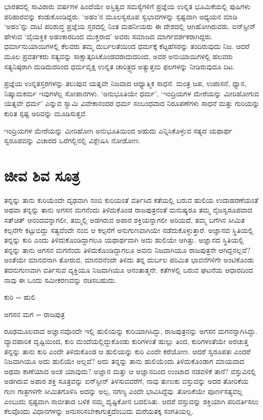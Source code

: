 ಭಾರತದಲ್ಲಿ ಸಾವಿರಾರು ವರ್ಷಗಳ ಹಿಂದೆಯೇ ಅಸ್ತಿತ್ವದ ಸಮಸ್ಯೆಗಳಿಗೆ ಪ್ರಜ್ಞೆಯ ಉನ್ನತ ಭೂಮಿಕೆಯಲ್ಲಿ ಪುಷಿಗಳು ಪರಿಹಾರವನ್ನು ಕಂಡುಕೊಂಡಿದ್ದರು. ‘ಅಹಂ’ನ ಮೂಲಸ್ವರೂಪ ಸ್ವಭಾವಗಳನ್ನು ಸ್ಪಷ್ಟವಾಗಿ ಅಧ್ಯಯನ ಮಾಡಿ ‘ಅಹಂ’ನ್ನು ದಾಟಿ ಪರಿಶುದ್ಧ ಪ್ರಜ್ಞೆಯ ಸ್ತರದಲ್ಲಿ ನಿಂತ ಮಹನೀಯರು ಈ ದೇಶದಲ್ಲಿ ಆಗಿಹೋಗಿರುವರು. ಐನ್​ಸ್ಟೀನ್ ಹೇಳುವ ‘ವೈಯಕ್ತಿಕ ಅಹಂಕಾರದಿಂದ ಮುಕ್ತರಾದ’ ಅವರು ಸಮಾಜದ ಮಾರ್ಗದರ್ಶಕರಾಗಿದ್ದರು. ಧರ್ಮಾನು\-ಯಾಯಿಗಳಲ್ಲಿ ಕೆಲವರು ತಮ್ಮ ದುರ್ಬಲತೆಯಿಂದ ಧರ್ಮಕ್ಕೆ ಕೆಟ್ಟಹೆಸರನ್ನು ತಂದಿರುವುದು ನಿಜ. ಆದರೆ ಮೂಲ ಪ್ರವರ್ತಕರು ಸತ್ಯವನ್ನು ಸಾಕ್ಷಾತ್ಕರಿಸಿಕೊಂಡವರಾದುದರಿಂದ, ಅವರ ಅನುಯಾಯಿಗಳಲ್ಲಿ ಹಲವರು ಸತ್ಯನಿಷ್ಠರಾಗಿ ದುಡಿದುದರಿಂದ ಧರ್ಮವೃಕ್ಷ ಉನ್ನತ ಚಾರಿತ್ರ್ಯದ ಅತ್ಯುತ್ತಮ ಫಲಗಳನ್ನು ನೀಡಿರುವುದೂ ದಿಟ.

ಪ್ರಜ್ಞೆಯ ಉನ್ನತಸ್ತರಗಳನ್ನು ತಲುಪುವ ಯತ್ನವೇ ನಿಜವಾದ ಆಧ್ಯಾತ್ಮಿಕ ಸಾಧನೆ. ಮಂತ್ರ ಜಪ, ಉಪಾಸನೆ, ಧ್ಯಾನ, ನಿಷ್ಕಾಮಕರ್ಮ ಇವುಗಳೆಲ್ಲ ಸೋಪಾನಗಳು. ‘ಅನುಭೂತಿಯೇ ಧರ್ಮ’, ‘ಇಂದ್ರಿಯಗಳ ಮೇರೆಯನ್ನು ಮೀರಿಹೋಗುವ ಯತ್ನವೇ ಧರ್ಮ’ ಎನ್ನುವ ಸ್ವಾಮಿ ವಿವೇಕಾನಂದರ ಧರ್ಮ ಸಂಬಂಧವಾದ ನಿರೂಪಣೆಗಳು ಸಾಧನೆ ಮತ್ತು ಗುರಿಯನ್ನು ಕುರಿತ ಸ್ಪಷ್ಟ ಅರಿವನ್ನು ಮೂಡಿಸುತ್ತವೆ.

ಇಂದ್ರಿಯಗಳ ಮೇರೆಯನ್ನು ಮೀರಿಹೋಗಿ ಅನುಭೂತಿಯಿಂದ ಅಹುದು ಎನ್ನಿಸಿಕೊಳ್ಳುವ ಸತ್ಯದ ಯಥಾರ್ಥ ಸ್ವರೂಪವನ್ನು ವಿಚಾರದ ಒರೆಗಲ್ಲಿನಲ್ಲಿ ವಿಶ್ಲೇಷಿಸಿ ನೋಡೋಣ.


\section*{ಜೀವ ಶಿವ ಸೂತ್ರ}


ತನ್ನನ್ನು ತಾನು ಕುರಿಯೆಂದೇ ದೃಢವಾಗಿ ನಂಬಿ ಕುರಿಯಂತೆ ವರ್ತಿಸಿದ ಕತೆಯಲ್ಲಿ ಬರುವ ಹುಲಿಯ ಉದಾಹರಣೆಯಂತೆ ಅಥವಾ ತನ್ನನ್ನು ತಾನು ಅಗಸನ ಮಗನೆಂದು ತಿಳಿದುಕೊಂಡ ರಾಜಪುತ್ರನಂತೆ ಮನುಷ್ಯರೂ ತಮ್ಮ ನೈಜಸ್ವರೂಪವಾದ ಸತ್​ಚಿತ್ ಆನಂದವನ್ನಾಗಲೀ, ತಮ್ಮಲ್ಲಿ ಅಡಗಿರುವ ಅಪಾರ ಶಕ್ತಿಯನ್ನಾಗಲೀ ಅರಿಯದೆ, ತಮ್ಮ ಬಗೆಗಿನ ಸೀಮಿತ ಕಲ್ಪನೆಗೇ ಕಟ್ಟುಬಿದ್ದು ಸತ್ಯವೆಂದೇ ನಂಬಿ ಆ ಕಲ್ಪನೆಗೆ ಅನುಗುಣವಾಗಿಯೇ ನಡೆದುಕೊಳ್ಳುತ್ತಾರೆ. ಅಜ್ಞಾನದ ಸ್ಥಿತಿಯಲ್ಲಿ ತನ್ನನ್ನು ಕುರಿ ಎಂದು ತಿಳಿದುಕೊಂಡಿದ್ದಾಗಲೂ ಯಥಾರ್ಥವಾಗಿ ಅದು ಹುಲಿಯೇ ಆಗಿತ್ತು. ಅಜ್ಞಾನದ ಸ್ಥಿತಿಯಲ್ಲಿ ತನ್ನನ್ನು ತಾನು ಅಗಸನ ಮಗನೆಂದು ತಿಳಿದುಕೊಂಡಿದ್ದಾಗಲೂ ಅವನು ನಿಜವಾಗಿಯೂ ರಾಜಪುತ್ರನೇ ಆಗಿದ್ದನಲ್ಲವೆ? ಅಂತೆಯೇ ಮಾನವನಾಗಿ ತೋರುವ, ಮಾನವನೆಂದೇ ತಿಳಿದು ತನ್ನ ದುರ್ಬಲ ಪರಿಮಿತ ಭಾವನೆಗಳಿಗೇ ಅಂಟಿಕೊಂಡು ತದನುಗುಣವಾಗಿ ವರ್ತಿಸುವ ವ್ಯಕ್ತಿಯೂ ನಿಜವಾಗಿಯೂ ಅನಂತಾತ್ಮನೇ. ಕತೆಗಳಲ್ಲಿ ಬರುವ ಘಟನೆಯ ಆಧಾರದಿಂದ ನಾವು ಈ ಒಂದು ಸಮೀಕರಣವನ್ನು ರಚಿಸಬಹುದು.

ಕುರಿ = ಹುಲಿ

ಅಗಸನ ಮಗ = ರಾಜಪುತ್ರ

ರೂಢಮೂಲವಾದ ಅಜ್ಞಾನವೊಂದೇ ಇಲ್ಲಿ ಹುಲಿಯನ್ನು ಕುರಿಯಾಗಿಸಿದ್ದು, ರಾಜಪುತ್ರನನ್ನು ಅಗಸನ ಮಗನನ್ನಾಗಿಸಿದ್ದು. ವ್ಯಾವಹಾರಿಕ ದೃಷ್ಟಿಯಿಂದ, ಕುರಿ ಮಂದೆಯಲ್ಲಿದ್ದುಕೊಂಡು ಕುರಿಗಳಂತೆ ಹುಲ್ಲು ತಿಂದ, ಕುರಿಗಳಂತೆಯೇ ಅರಚುತ್ತ ತನ್ನನ್ನು ತಾನು ಕುರಿ ಎಂದೇ ತಿಳಿದುಕೊಂಡ ಆ ಹುಲಿಯನ್ನು ಕುರಿ ಎಂದೇ ಕರೆಯೋಣ. ಆದರೆ ಸ್ವರೂಪತಃ ಎಂದರೆ ನಿಜವಾಗಿಯೂ ಅದು ಹುಲಿಯೇ ಅಲ್ಲವೆ? ಅದು ತನ್ನನ್ನು ತಾನು ಹುಲಿಯೆಂದು ತಿಳಿದುಕೊಂಡಾಗ ಮಾಯವಾದ ಅಥವಾ ಕಾಣೆಯಾದ ಅಂಶ ಯಾವುದು? ಅಜ್ಞಾನ ಮತ್ತು ಆ ಅಜ್ಞಾನದಿಂದ ಉಂಟಾದ ನಡವಳಿಕೆ ತಾನೆ? ವಸ್ತುವಿನಲ್ಲಿ ಅಡಗಿರುವ ಅಪಾರ ಶಕ್ತಿ ಸೂತ್ರವನ್ನು ಐನ್​ಸ್ಟೀನ್ ತಿಳಿಸುವವರೆಗೆ, ನಾವು ತುಣುಕು ವಸ್ತುವನ್ನು ಅದರ ತೋರಿಕೆಯ ಗುಣ ಗಾತ್ರಗಳಿಗೇ ಸೀಮಿತಗೊಳಿಸಿ ಅದನ್ನು ಅಲ್ಪ, ನಗಣ್ಯ ಎಂದೇ ಭಾವಿಸಿದ್ದೆವು. ತೋರಿಕೆಯೇ ಪೂರ್ಣಸತ್ಯವಲ್ಲ ಎಂಬುದು ಸ್ಪಷ್ಟವಾಗಿ ಸಾಬೀತಾದ ಬಳಿಕ ನಮ್ಮ ದೃಷ್ಟಿಕೋನ ಬದಲಿಸಿತು. ಆದರೆ ವಸ್ತುವನ್ನು ಶಕ್ತಿಯಾಗಿ ಪರಿವರ್ತಿಸಲು ಕೆಲವೊಂದು ವಿಧಾನಗಳನ್ನು ಅನುಸರಿಸಬೇಕಾಗುತ್ತದೆಂಬುದು ಮರೆಯತಕ್ಕ ಸಂಗತಿಯಲ್ಲ.

